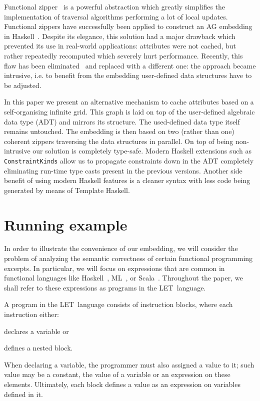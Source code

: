 \documentclass[runningheads]{llncs}
\newcommand{\texfamily}{\fontfamily{cmtex}\selectfont}
\newcommand{\Let}{{\sf LET}}
\begin{document}
  Functional zipper~\cite{huet1997zipper} is a powerful abstraction which
  greatly simplifies the implementation of traversal algorithms performing a lot
  of local updates. Functional zippers have successfully been applied to
  construct an AG embedding in
  Haskell~\cite{DBLP:conf/sblp/MartinsFS13,MARTINS20162}. Despite its elegance,
  this solution had a major drawback which prevented its use in real-world
  applications: attributes were not cached, but rather repeatedly recomputed
  which severely hurt performance. Recently, this flaw has been
  eliminated~\cite{FERNANDES2018} and replaced with a different one: the
  approach became intrusive, i.e. to benefit from the embedding user-defined
  data structures have to be adjusted.

  In this paper we present an alternative mechanism to cache attributes based on
  a self-organising infinite grid. This graph is laid on top of the user-defined
  algebraic data type (ADT) and mirrors its structure. The used-defined data type
  itself remains untouched. The embedding is then based on two (rather than one)
  coherent zippers traversing the data structures in parallel. On top of being
  non-intrusive our solution is completely type-safe. Modern Haskell extensions
  such as \texttt{ConstraintKinds} allow us to propagate constraints down in the
  ADT completely eliminating run-time type casts present in the previous
  versions. Another side benefit of using modern Haskell features is a cleaner
  syntax with less code being generated by means of Template Haskell.




\section{Running example}


\newcommand{\withSub}[2]{{\parbox{\widthof{#1#2}}{#1$_\text{#2}$}}}
\newcommand{\itWithSub}[2]{{\parbox{\widthof{#1#2}}{\textit{#1}$_\text{#2}$}}}


In order to illustrate the convenience of our embedding, we will consider the
problem of analyzing the semantic correctness of certain functional programming
excerpts. In particular, we will focus on \text{\texfamily {\bfseries let}} expressions that are common in
functional languages like Haskell~\cite{}, ML~\cite{}, or Scala~\cite{}.
Throughout the paper, we shall refer to these expressions as programs in the
\Let\ language.

A program in the \Let\ language consists of instruction blocks, where each
instruction either:
\begin{enumerate*}[i)]
  \item declares a variable or
  \item defines a nested block.
\end{enumerate*}
When declaring a variable, the programmer must also assigned a value to it; such
value may be a constant, the value of a variable or an expression on these
elements. Ultimately, each block defines a value as an expression on variables
defined in it.
\end{document}
